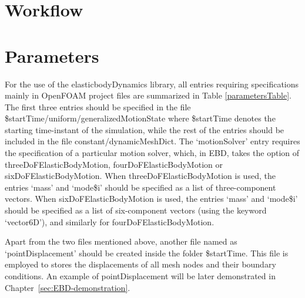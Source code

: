 \label{sec:EBD-usage}

\section{Workflow}

\section{Parameters}

For the use of the elasticbodyDynamics library, all entries requiring specifications mainly in OpenFOAM project files are summarized in Table \ref{parametersTable}. The first three entries should be specified in the file \$startTime/uniform/generalizedMotionState where \$startTime denotes the starting time-instant of the simulation, while the rest of the entries should be included in the file constant/dynamicMeshDict. The `motionSolver' entry requires the specification of a particular motion solver, which, in EBD, takes the option of threeDoFElasticBodyMotion, fourDoFElasticBodyMotion or sixDoFElasticBodyMotion. When threeDoFElasticBodyMotion is used, the entries `mass' and `mode\$i' should be specified as a list of three-component vectors. When sixDoFElasticBodyMotion is used, the entries `mass' and `mode\$i' should be specified as a list of six-component vectors (using the keyword `vector6D'), and similarly for fourDoFElasticBodyMotion.

Apart from the two files mentioned above, another file named as `pointDisplacement' should be created inside the folder \$startTime. This file is employed to stores the displacements of all mesh nodes and their boundary conditions. An example of pointDisplacement will be later demonstrated in Chapter~\ref{sec:EBD-demonstration}.

